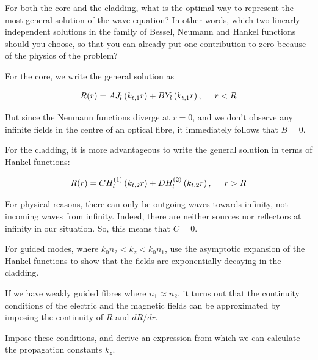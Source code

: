 \begin{cue}
For both the core and the cladding, what is the optimal way to represent the most general solution of the wave equation? In other words, which two linearly independent solutions in the family of Bessel, Neumann and Hankel functions should you choose, so that you can already put one contribution to zero because of the physics of the problem?
\end{cue}

For the core, we write the general solution as

\begin{equation}
R(r) = A J_l\left(k_{t,1}r\right) + B Y_l\left(k_{t,1}r\right), \hspace{0.5 cm} r<R \label{eq-fibre-1}
\end{equation} 

But since the Neumann functions diverge at $r=0$, and we don't observe any infinite fields in the centre of an optical fibre, it immediately follows that $B=0$.

For the cladding, it is more advantageous to write the general solution in terms of Hankel functions:

\begin{equation}
R(r) = C H_l^{(1)}\left(k_{t,2}r\right) + D H_l^{(2)}\left(k_{t,2}r\right), \hspace{0.5 cm} r>R \label{eq-fibre-2}
\end{equation} 

For physical reasons, there can only be outgoing waves towards infinity, not incoming waves from infinity. Indeed, there are neither sources nor reflectors at infinity in our situation. So, this means that $C=0$.

\begin{exer}
For guided modes, where $k_0 n_2 < k_z < k_0 n_1$, use the asymptotic expansion of the Hankel functions to show that the fields are exponentially decaying in the cladding.
\end{exer}

If we have weakly guided fibres where $n_1 \approx n_2$, it turns out that the continuity conditions of the electric and the magnetic fields can be approximated by imposing the continuity of $R$ and $d R / d r$.

\begin{cue}
Impose these conditions, and derive an expression from which we can calculate the propagation constants $k_z$. 
\end{cue}


